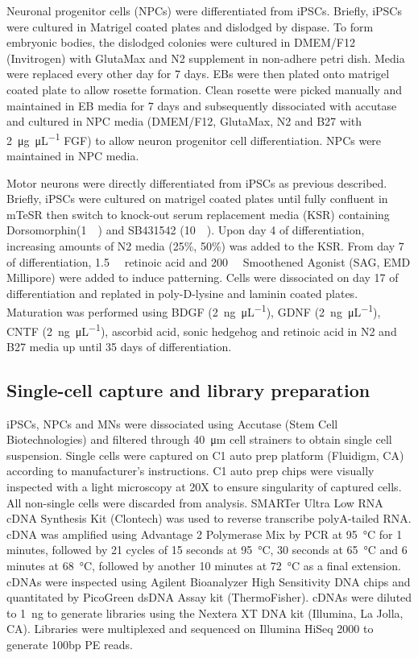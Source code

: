 Neuronal progenitor cells (NPCs) were differentiated from iPSCs. Briefly, iPSCs were cultured in Matrigel coated plates and dislodged by dispase. To form embryonic bodies, the dislodged colonies were cultured in DMEM/F12 (Invitrogen) with GlutaMax and N2 supplement in non-adhere petri dish. Media were replaced every other day for 7 days. EBs were then plated onto matrigel coated plate to allow rosette formation. Clean rosette were picked manually and maintained in EB media for 7 days and subsequently dissociated with accutase and cultured in NPC media (DMEM/F12, GlutaMax, N2 and B27 with \SI[per-mode=symbol]{2}{\micro\gram\per\micro\liter} FGF) to allow neuron progenitor cell differentiation. NPCs were maintained in NPC media.

Motor neurons were directly differentiated from iPSCs as previous described\cite{Chambers:2009ey}. Briefly, iPSCs were cultured on matrigel coated plates until fully confluent in mTeSR then switch to knock-out serum replacement media (KSR) containing Dorsomorphin(\SI{1}{\micro\Molar}) and SB431542 (\SI{10}{\micro\Molar}). Upon day 4 of differentiation, increasing amounts of N2 media (25\%, 50\%) was added to the KSR. From day 7 of differentiation, \SI{1.5}{\micro\Molar} retinoic acid and \SI{200}{\nano\Molar} Smoothened Agonist (SAG, EMD Millipore) were added to induce patterning. Cells were dissociated on day 17 of differentiation and replated in poly-D-lysine and laminin coated plates. Maturation was performed using BDGF (\SI[per-mode=symbol]{2}{\nano\gram\per\micro\liter}), GDNF (\SI[per-mode=symbol]{2}{\nano\gram\per\micro\liter}), CNTF (\SI[per-mode=symbol]{2}{\nano\gram\per\micro\liter}), ascorbid acid, sonic hedgehog and retinoic acid in N2 and B27 media up until 35 days of differentiation.


\subsection{Single-cell capture and library preparation}

iPSCs, NPCs and MNs were dissociated using Accutase (Stem Cell\\Biotechnologies) and filtered through \SI{40}{\micro\meter} cell strainers to obtain single cell suspension. Single cells were captured on C1 auto prep platform (Fluidigm, CA) according to manufacturer's instructions. C1 auto prep chips were visually inspected with a light microscopy at 20X to ensure singularity of captured cells. All non-single cells were discarded from analysis. SMARTer Ultra Low RNA cDNA Synthesis Kit (Clontech) was used to reverse transcribe polyA-tailed RNA. cDNA was amplified using Advantage 2 Polymerase Mix by PCR at \SI{95}{\degreeCelsius} for 1 minutes, followed by 21 cycles of 15 seconds at \SI{95}{\degreeCelsius}, 30 seconds at \SI{65}{\degreeCelsius} and 6 minutes at \SI{68}{\degreeCelsius}, followed by another 10 minutes at \SI{72}{\degreeCelsius} as a final extension. cDNAs were inspected using Agilent Bioanalyzer High Sensitivity DNA chips and quantitated by PicoGreen dsDNA Assay kit (ThermoFisher). cDNAs were diluted to \SI{1}{\nano\gram} to generate libraries using the Nextera XT DNA kit (Illumina, La Jolla, CA). Libraries were multiplexed and sequenced on Illumina HiSeq 2000 to generate 100bp PE reads.

